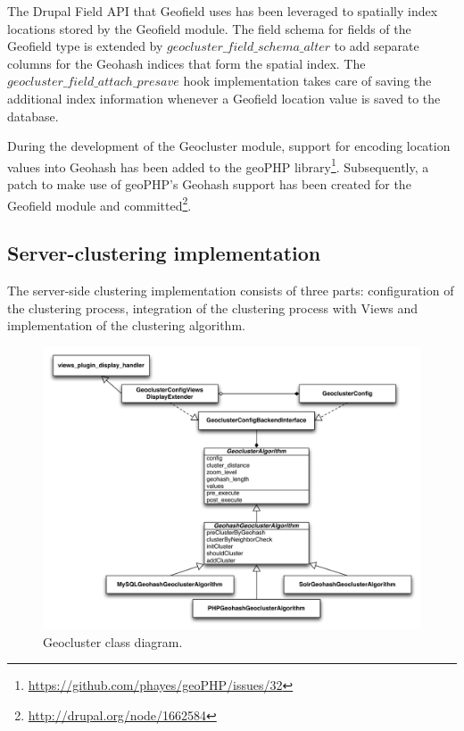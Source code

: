 The Drupal Field API that Geofield uses has been leveraged to spatially index locations stored by the Geofield module. The field schema for fields of the Geofield type is extended by $geocluster\_field\_schema\_alter$ to add separate columns for the Geohash indices that form the spatial index. The $geocluster\_field\_attach\_presave$ hook implementation takes care of saving the additional index information whenever a Geofield location value is saved to the database.

During the development of the Geocluster module, support for encoding location values into Geohash has been added to the geoPHP library\footnote{\url{https://github.com/phayes/geoPHP/issues/32}}. Subsequently, a patch to make use of geoPHP's Geohash support has been created for the Geofield module and committed\footnote{\url{http://drupal.org/node/1662584}}. 


\subsection{Server-clustering implementation}

The server-side clustering implementation consists of three parts: configuration of the clustering process, integration of the clustering process with Views and implementation of the clustering algorithm.

\begin{figure}[h]
  \begin{center}
    \includegraphics[width=1\textwidth]{figures/geocluster_class_diagram.pdf}
    \caption{Geocluster class diagram.}
    \label{fig:geocluster-class-diagram}
  \end{center}
\end{figure}

